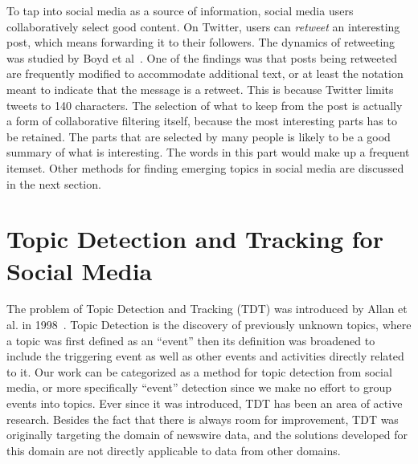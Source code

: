 \documentclass[letterpaper,12pt,titlepage,oneside,final]{book}
\begin{document}
To tap into social media as a source of information, 
social media users collaboratively select good content.
On Twitter, users can \emph{retweet} an interesting post, 
which means forwarding it to their followers.
The dynamics of retweeting was studied by Boyd et al~\cite{boyd2010tweet}.
One of the findings was that posts being retweeted 
are frequently modified to accommodate additional 
text, or at least the notation meant to indicate 
that the message is a retweet. 
This is because Twitter limits tweets to 140 characters.
The selection of what to keep from the post is actually 
a form of collaborative filtering itself, 
because the most interesting parts has 
to be retained. 
The parts that are selected by many people
is likely to be a good summary of what is interesting.
The words in this part would make up a frequent itemset.
Other methods for finding emerging topics in social media
are discussed in the next section.

\section{Topic Detection and Tracking for Social Media}

The problem of Topic Detection and Tracking (TDT) was introduced by Allan et al. in 1998~\cite{allan1998topic}.
Topic Detection is the discovery of previously unknown topics, 
where a topic was first defined as an ``event'' then 
its definition was broadened to include the triggering event 
as well as 	other events and activities directly related to it.
Our work can be categorized as a method for topic detection from social media,
or more specifically ``event'' detection since we make no effort to group events into topics.
Ever since it was introduced, TDT has been an area of active research.
Besides the fact that there is always room for improvement, 
TDT was originally targeting the domain of newswire data, 
and the solutions developed for this domain are not directly applicable to 
data from other domains. 
\end{document}
